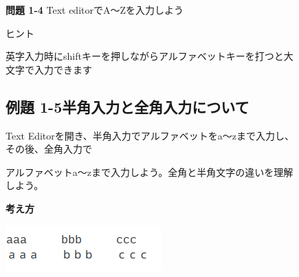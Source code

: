 \documentclass[a4paper,12pt]{jarticle}
\begin{document}
\begin{figure}[ht]
\flushleft
{\bfseries 問題 1-4}
Text editorでA〜Zを入力しよう　

ヒント　

英字入力時にshiftキーを押しながらアルファベットキーを打つと大文字で入力できます
\end{figure}
\clearpage
\begin{figure}[ht]
\subsection{例題
1-5半角入力と全角入力について}
Text
Editorを開き、半角入力でアルファベットをa〜zまで入力し、その後、全角入力で

アルファベットa〜zまで入力しよう。全角と半角文字の違いを理解しよう。

{\bf\large 考え方}

\centering
\includegraphics[width=5.978cm,height=1.773cm]{textbook-img066.png}

\begin{minipage}{16.578cm}

\bigskip


\end{minipage}
\end{figure}
\end{document}
